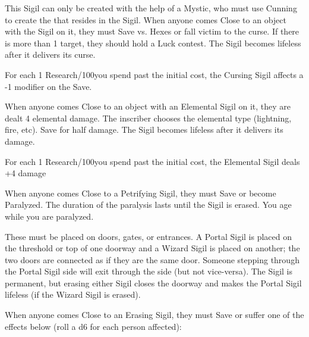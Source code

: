 
This Sigil can only be created with the help of a Mystic, who must use Cunning to create the  that resides in the Sigil.  When anyone comes Close to an object with the Sigil on it, they must Save vs. Hexes or fall victim to the curse. If there is more than 1 target, they should hold a Luck contest.  The Sigil becomes lifeless after it delivers its curse.

For each 1 Research/100\AG you spend past the initial cost, the Cursing Sigil affects a -1 modifier on the Save.



When anyone comes Close to an object with an Elemental Sigil on it, they are dealt 4 elemental damage.  The inscriber chooses the elemental type (lightning, fire, etc).  Save for half damage.  The Sigil becomes lifeless after it delivers its damage.

For each 1 Research/100\AG you spend past the initial cost, the Elemental Sigil deals +4 damage



When anyone comes Close to a Petrifying Sigil, they must Save or become Paralyzed.  The duration of the paralysis lasts until the Sigil is erased. You age while you are paralyzed.


These must be placed on doors, gates, or entrances.  A Portal Sigil is placed on the threshold or top of one doorway and a Wizard Sigil is placed on another; the two doors are connected as if they are the same door.  Someone stepping through the Portal Sigil side will exit through the  side (but not vice-versa).  The Sigil is permanent, but erasing either Sigil closes the doorway and makes the Portal Sigil lifeless (if the Wizard Sigil is erased).

\large{}\normalsize






When anyone comes Close to an Erasing Sigil, they must Save or suffer one of the effects below (roll a d6 for each person affected):

